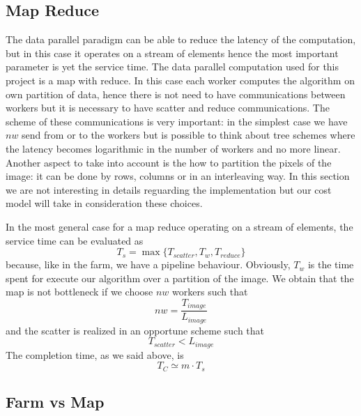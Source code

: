 \subsection{Map Reduce}

The data parallel paradigm can be able to reduce the latency of the computation, but in this case it operates on a stream of elements hence the most important parameter is yet the service time. The data parallel computation used for this project is a map with reduce. In this case each worker computes the algorithm on own partition of data, hence there is not need to have communications between workers but it is necessary to have scatter and reduce communications. The scheme of these communications is very important: in the simplest case we have $nw$ send from or to the workers but is possible to think about tree schemes where the latency becomes logarithmic in the number of workers and no more linear. Another aspect to take into account is the how to partition the pixels of the image: it can be done by rows, columns or in an interleaving way. In this section we are not interesting in details reguarding the implementation but our cost model will take in consideration these choices.

In the most general case for a map reduce operating on a stream of elements, the service time can be evaluated as
\[
T_{s} = \max\lbrace T_{scatter}, T_{w}, T_{reduce}\rbrace
\]
because, like in the farm, we have a pipeline behaviour. Obviously, $T_{w}$ is the time spent for execute our algorithm over a partition of the image. We obtain that the map is not bottleneck if we choose $nw$ workers such that
\[
nw = \frac{T_{image}}{L_{image}}
\]
and the scatter is realized in an opportune scheme such that
\[
T_{scatter} < L_{image}
\]
The completion time, as we said above, is
\[
T_{C} \simeq m \cdot T_{s}
\]
\subsection{Farm vs Map}
